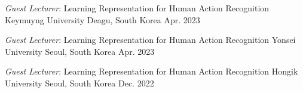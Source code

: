 \cventry
{\textit{Guest Lecturer}: Learning Representation for Human Action Recognition}
{Keymuyng University}
{Deagu, South Korea}
{Apr. 2023}
{}


\vspace{-1em}
\cventry
{\textit{Guest Lecturer}: Learning Representation for Human Action Recognition}
{Yonsei University}
{Seoul, South Korea}
{Apr. 2023}
{}

\vspace{-1em}
\cventry
{\textit{Guest Lecturer}: Learning Representation for Human Action Recognition}
{Hongik University}
{Seoul, South Korea}
{Dec. 2022}
{}
\vspace{-1em}

